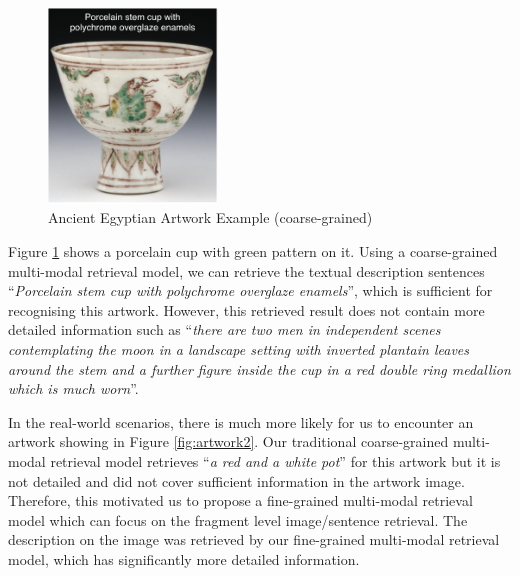 \begin{figure}[h!]
\centering
\includegraphics[width=0.4\textwidth]{artwork_fine1.pdf}
\caption{Ancient Egyptian Artwork Example (coarse-grained)}
\label{fig:artwork1}
\end{figure}

Figure \ref{fig:artwork1} shows a porcelain cup with green pattern on it. Using a coarse-grained multi-modal retrieval model, we can retrieve the textual description sentences ``\textit{Porcelain stem cup with polychrome overglaze enamels}'', which is sufficient for recognising this artwork. However, this retrieved result does not contain more detailed information such as ``\textit{there are two men in independent scenes contemplating the moon in a landscape setting with inverted plantain leaves around the stem and a further figure inside the cup in a red double ring medallion which is much worn}''. 

In the real-world scenarios, there is much more likely for us to encounter an artwork showing in Figure \ref{fig:artwork2}. Our traditional coarse-grained multi-modal retrieval model retrieves ``\textit{a red and a white pot}'' for this artwork but it is not detailed and did not cover sufficient information in the artwork image. Therefore, this motivated us to propose a fine-grained multi-modal retrieval model which can focus on the fragment level image/sentence retrieval. The description on the image was retrieved by our fine-grained multi-modal retrieval model, which has significantly more detailed information.

